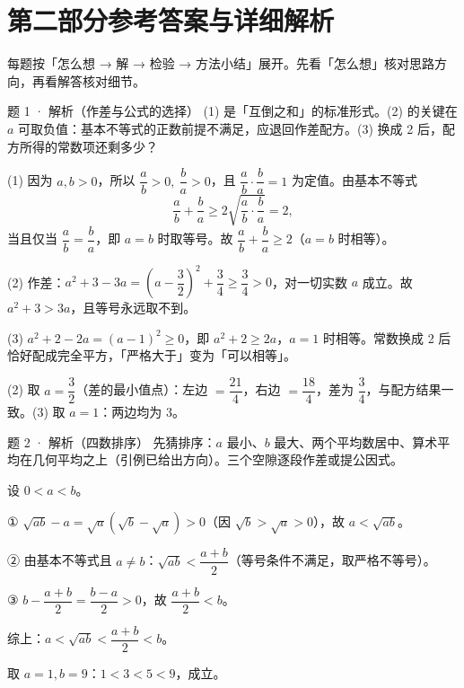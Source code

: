 \section*{第二部分\quad 参考答案与详细解析}

\begin{strand}
每题按「怎么想 → 解 → 检验 → 方法小结」展开。先看「怎么想」核对思路方向，再看解答核对细节。
\end{strand}

\begin{solution}{题 1 · 解析（作差与公式的选择）}
\think (1) 是「互倒之和」的标准形式。(2) 的关键在 $a$ 可取负值：基本不等式的正数前提不满足，应退回作差配方。(3) 换成 2 后，配方所得的常数项还剩多少？

\solve (1) 因为 $a,b>0$，所以 $\dfrac ab>0,\ \dfrac ba>0$，且 $\dfrac ab\cdot\dfrac ba=1$ 为定值。由基本不等式
\[
\frac ab+\frac ba\ge 2\sqrt{\frac ab\cdot\frac ba}=2,
\]
当且仅当 $\dfrac ab=\dfrac ba$，即 $a=b$ 时取等号。故 $\dfrac ab+\dfrac ba\ge 2$（$a=b$ 时相等）。

(2) 作差：$a^2+3-3a=\left(a-\dfrac32\right)^2+\dfrac34\ge\dfrac34>0$，对一切实数 $a$ 成立。故 $a^2+3>3a$，且等号永远取不到。

(3) $a^2+2-2a=(a-1)^2\ge 0$，即 $a^2+2\ge 2a$，$a=1$ 时相等。常数换成 2 后恰好配成完全平方，「严格大于」变为「可以相等」。

\checkup (2) 取 $a=\dfrac32$（差的最小值点）：左边 $=\dfrac{21}4$，右边 $=\dfrac{18}4$，差为 $\dfrac34$，与配方结果一致。(3) 取 $a=1$：两边均为 3。

\end{solution}

\begin{solution}{题 2 · 解析（四数排序）}
\think 先猜排序：$a$ 最小、$b$ 最大、两个平均数居中、算术平均在几何平均之上（引例已给出方向）。三个空隙逐段作差或提公因式。

\solve 设 $0<a<b$。

① $\sqrt{ab}-a=\sqrt a(\sqrt b-\sqrt a)>0$（因 $\sqrt b>\sqrt a>0$），故 $a<\sqrt{ab}$。

② 由基本不等式且 $a\ne b$：$\sqrt{ab}<\dfrac{a+b}{2}$（等号条件不满足，取严格不等号）。

③ $b-\dfrac{a+b}{2}=\dfrac{b-a}{2}>0$，故 $\dfrac{a+b}{2}<b$。

综上：$a<\sqrt{ab}<\dfrac{a+b}{2}<b$。

\checkup 取 $a=1,b=9$：$1<3<5<9$，成立。

\end{solution}

